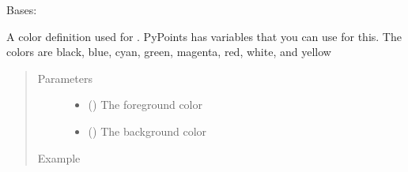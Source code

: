 \documentclass[letterpaper,10pt,english]{sphinxmanual}
\begin{document}

\begin{fulllineitems}
\label{\detokenize{pypoints:pypoints.Color}}
Bases: 

A color definition used for {\hyperref[\detokenize{pypoints:pypoints.Font}]{}}. PyPoints has variables that you can use for this. The colors are black, blue, cyan, green, magenta, red, white, and yellow
\begin{quote}\begin{description}
\item[{Parameters}] \leavevmode\begin{itemize}
\item {} 
 () \textendash{} The foreground color

\item {} 
 () \textendash{} The background color

\end{itemize}

\item[{Example}] \leavevmode
\end{description}\end{quote}

\begin{sphinxVerbatim}[commandchars=\\\{\}]
   
\end{sphinxVerbatim}




{\hyperref[\detokenize{pypoints:pypoints.Font}]{}}



\end{fulllineitems}

\end{document}

